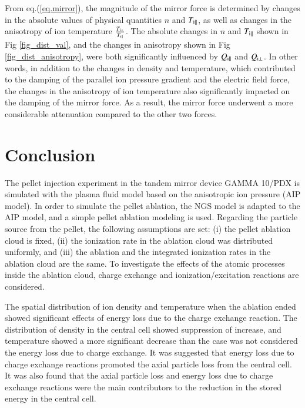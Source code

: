 \documentclass{jasse}%
\begin{document}
From eq.(\ref{eq.mirror}), the magnitude of the mirror force is determined by changes in the absolute values of physical quantities $n$ and $T_{\rm{i}\parallel}$, as well as changes in the anisotropy of ion temperature $\frac{T_{\rm{i}\bot}}{T_{\rm{i}\parallel}}$. The absolute changes in $n$ and $T_{\rm{i}\parallel}$ shown in Fig \ref{fig_dist_val}, and the changes in anisotropy shown in Fig \ref{fig_dist_anisotropy}, were both significantly influenced by $Q_{\rm{i}\parallel}$ and $Q_{\rm{i}\bot}$. In other words, in addition to the changes in density and temperature, which contributed to the damping of the parallel ion pressure gradient and the electric field force, the changes in the anisotropy of ion temperature also significantly impacted on the damping of the mirror force. As a result, the mirror force underwent a more considerable attenuation compared to the other two forces.

\section{Conclusion}
The pellet injection experiment in the tandem mirror device GAMMA 10/PDX is simulated with the plasma fluid model based on the anisotropic ion pressure (AIP model). In order to simulate the pellet ablation, the NGS model is adapted to the AIP model, and a simple pellet ablation modeling is used. Regarding the particle source from the pellet, the following assumptions are set: (i) the pellet ablation cloud is fixed, (ii) the ionization rate in the ablation cloud was distributed uniformly, and (iii) the ablation and the integrated ionization rates in the ablation cloud are the same. To investigate the effects of the atomic processes inside the ablation cloud, charge exchange and ionization/excitation reactions are considered. 

The spatial distribution of ion density and temperature when the ablation ended showed significant effects of energy loss due to the charge exchange reaction. The distribution of density in the central cell showed suppression of increase, and temperature showed a more significant decrease than the case was not considered the energy loss due to charge exchange. It was suggested that energy loss due to charge exchange reactions promoted the axial particle loss from the central cell. It was also found that the axial particle loss and energy loss due to charge exchange reactions were the main contributors to the reduction in the stored energy in the central cell. 
 
\end{document}
